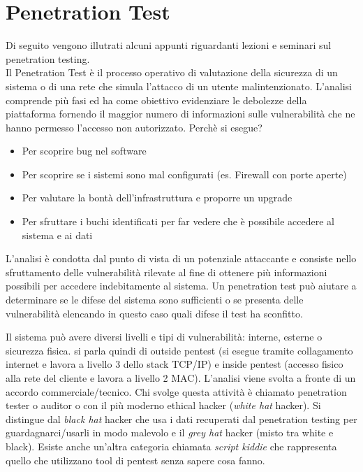 \appendix
\chapter{Penetration Test}
Di seguito vengono illutrati alcuni appunti riguardanti lezioni e seminari sul penetration testing.\\

Il Penetration Test è il processo operativo di valutazione della sicurezza di un sistema o di una rete che simula l'attacco di un utente malintenzionato. L'analisi comprende più fasi ed ha come obiettivo evidenziare le debolezze della piattaforma fornendo il maggior numero di informazioni sulle vulnerabilità che ne hanno permesso l'accesso non autorizzato. Perchè si esegue?
\begin{itemize}
\item Per scoprire bug nel software
\item Per scoprire se i sistemi sono mal configurati (es. Firewall con porte aperte)
\item Per valutare la bontà dell'infrastruttura e proporre un upgrade
\item Per sfruttare i buchi identificati per far vedere che è possibile accedere al sistema e ai dati
\end{itemize}

L'analisi è condotta dal punto di vista di un potenziale attaccante e consiste nello sfruttamento delle vulnerabilità rilevate al fine di ottenere più informazioni possibili per accedere indebitamente al sistema. Un penetration test può aiutare a determinare se le difese del sistema sono sufficienti o se presenta delle vulnerabilità elencando in questo caso quali difese il test ha sconfitto. 

Il sistema può avere diversi livelli e tipi di vulnerabilità: interne, esterne o sicurezza fisica. si parla quindi di outside pentest (si esegue tramite collagamento internet e lavora a livello 3 dello stack TCP/IP) e inside pentest (accesso fisico alla rete del cliente e lavora a livello 2 MAC).  L'analisi viene svolta a fronte di un accordo commerciale/tecnico. Chi svolge questa attività è chiamato penetration tester o auditor o con il più moderno ethical hacker (\textit{white hat} hacker). Si distingue dal \textit{black hat} hacker che usa i dati recuperati dal penetration testing per guardagnarci/usarli in modo malevolo e il \textit{grey hat} hacker (misto tra white e black). Esiste anche un'altra categoria chiamata \textit{script kiddie} che rappresenta quello che utilizzano tool di pentest senza sapere cosa fanno.

